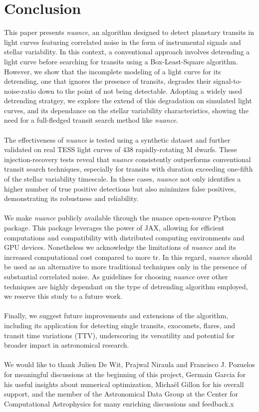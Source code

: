 \documentclass[modern]{aastex631}
\newcommand{\nuancemethod}{\textit{nuance}}
\newcommand{\nuancecode}{\textsf{nuance}}
\begin{document}
\section{Conclusion}
This paper presents \nuancemethod{}, an algorithm designed to detect planetary transits in light curves featuring correlated noise in the form of instrumental signals and stellar variability. In this context, a conventional approach involves detrending a light curve before searching for transits using a Box-Least-Square algorithm. However, we show that the incomplete modeling of a light curve for its detrending, one that ignores the presence of transits, degrades their signal-to-noise-ratio down to the point of not being detectable. Adopting a widely used detrending stratgey, we explore the extend of this degradation on simulated light curves, and its dependance on the stellar variability characteristics, showing the need for a full-fledged transit search method like \nuancemethod{}.\\\\
The effectiveness of \nuancemethod{} is tested using a synthetic dataset and further validated on real TESS light curves of 438 rapidly-rotating M dwarfs. These injection-recovery tests reveal that \nuancemethod{} consistently outperforms conventional transit search techniques, especially for transits with duration exceeding one-fifth of the stellar variability timescale. In these cases, \nuancemethod{} not only identifies a higher number of true positive detections but also minimizes false positives, demonstrating its robustness and reliability.\\\\
We make \nuancemethod{} publicly available through the \nuancecode{} open-source Python package. This package leverages the power of JAX, allowing for efficient computations and compatibility with distributed computing environments and GPU devices. Nonetheless we acknowledge the limitations of \nuancemethod{} and its increased computational cost compared to more tr. In this regard, \nuancemethod{} should be used as an alternative to more traditional techniques only in the presence of substantial correlated noise. As guidelines for choosing \nuancemethod{} over other techniques are highly dependant on the type of detrending algorithm employed, we reserve this study to a future work.\\\\
Finally, we suggest future improvements and extensions of the algorithm, including its application for detecting single transits, exocomets, flares, and transit time variations (TTV), underscoring its versatility and potential for broader impact in astronomical research.
\\\\
\vfill{}
We would like to thank Julien De Wit, Prajwal Niraula and Francisco J. Pozuelos for meaningful discussions at the beginning of this project, Germain Garcia for his useful insights about numerical optimization, Michaël Gillon for his overall support, and the member of the Astronomical Data Group at the Center for Computational Astrophysics for many enriching discussions and feedback.x
\end{document}
